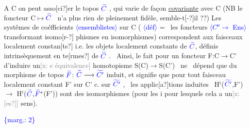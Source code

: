 \documentclass[11pt]{article}
\newcommand{\scanpage}[1]{\par\bigskip\noindent{\small\sffamily[scan #1]}\par}
\newcommand{\mspage}[1]{{\small\sffamily[p.\,#1]}}
\newcommand{\hand}[1]{\textcolor{blue}{#1}}
\newcommand{\inserted}[2][]{\textcolor{blue}{$\langle$#2$\rangle$}}
\newcommand{\margin}[1]{\textcolor{blue}{\{\textsf{marg.:} #1\}}}
\newcommand{\xout}[1]{\textcolor{gray}{[\textsf{x:} #1]}}
\newcommand{\uline}[1]{\underline{#1}}
\newcommand{\unsure}[1]{[#1?]}
\begin{document}
A C on peut asso\unsure{ci}er le topos $\hand{\widetilde{C}}$ , qui varie de façon \uline{covariante} avec C
(NB le foncteur C$\longmapsto$$\hand{\widetilde{C}}$ \ n'a plus rien de pleinement fidèle, semble-t\unsure{-}il ??)
Les systêmes de coéfficients \inserted{ensemblistes} sur C ( \inserted{déf} = \ les foncteurs \inserted{$C^{o} \longrightarrow$ Ens} transformant isomo\unsure{r-}%
phismes en isomorphismes) correspondent aux faisceaux localement constan\unsure{ts}
i.e. les objets localement constants de $\hand{\widetilde{C}}$, définis intrinsèquement en te\unsure{rmes}
de $\hand{\widetilde{C}}$ . \ Ainsi, le fait pour un foncteur F:C$\longrightarrow$C' d'induire un\xout{e équivalence}
homotopisme S(C)$\longrightarrow$S(C') \ ne \ dépend que du morphisme de topos $\hand{\widetilde{F}}$: $\hand{\widetilde{C}} \longrightarrow \hand{\widetilde{C'}}$
induit, et signifie que pour tout faisceau localement constant F' sur C'
c. sur $\hand{\widetilde{C'}}$ , \ les applic\unsure{a}tions induites \ H$^{i}$($\hand{\widetilde{C'}}$,F') $\longrightarrow$ H$^{i}$($\hand{\widetilde{C}}$,$\hand{\widetilde{F}}^{*}$(F'))
sont des isomorphismes (pour les i pour lesquels cela a un\xout{\unsure{es}} sens).

\margin{2}

\clearpage
\scanpage{162-5/3}
\mspage{\hand{2}}
\end{document}
